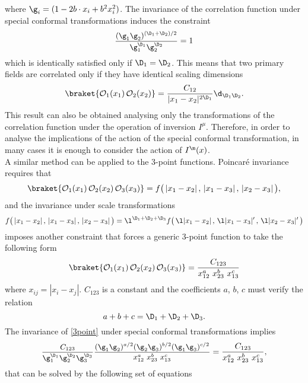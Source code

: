 \documentclass[a4paper,11pt,openright,twoside]{book}
\newcommand{\mO}{\mathcal{O}}
\newcommand{\sdfrac}[2]{\mbox{\small$\displaystyle\frac{#1}{#2}$}}
\numberwithin{equation}{section}
\begin{document}
where $\g_i=(1-2b\cdot x_i+b^2 x_i^2)$. The invariance of the correlation function under special conformal transformations induces the constraint
\begin{equation}
	\sdfrac{(\g_1\g_2)^{(\D_1+\D_2)/2}}{\g_1^{\D_1}\g_2^{\D_2}}=1
\end{equation}
which is identically satisfied only if $\D_1=\D_2$. This means that two primary fields are correlated only if they have identical scaling dimensions
\begin{equation}
	\braket{\mO_1(x_1)\,\mO_2(x_2)}=\frac{C_{12}}{|x_1-x_2|^{2\D_1}}\d_{\D_1\D_2}.\label{2poin}
\end{equation}
This result can also be obtained analysing only the transformations of the correlation function under the operation of inversion $I^\mu$. Therefore, in order to analyse the implications of the action of the special conformal transformation, in many cases it is enough to consider the action of $I^\m(x)$. \\
A similar method can be applied to the 3-point functions. Poincar\'e invariance requires that
\begin{equation}
	\braket{\mO_1(x_1)\,\mO_2(x_2)\,\mO_3(x_3)}=f\big(\,|x_1-x_2|\, ,\, |x_1-x_3|\,,\,|x_2-x_3|\,\big),
\end{equation}
and the invariance under scale transformations 
\begin{equation}
	f\big(\,|x_1-x_2|\, ,\, |x_1-x_3|\,,\,|x_2-x_3|\,\big)=\l^{\D_1+\D_2+\D_3}f\big(\,\l|x_1-x_2|\, ,\, \l|x_1-x_3|'\,,\,\l|x_2-x_3|'\,\big)
\end{equation}
imposes another constraint that forces a generic 3-point function to take the following form
\begin{equation}
	\braket{\mO_1(x_1)\,\mO_2(x_2)\,\mO_3(x_3)}=\frac{C_{123}}{x_{12}^a\ x_{23}^b\ x_{13}^c}\label{3point}
\end{equation}
where $x_{ij}=|x_i-x_j|$. $C_{123}$ is a constant and the coefficients $a$, $b$, $c$ must verify the relation
\begin{equation}
	a+b+c=\D_1+\D_2+\D_3.
\end{equation}
The invariance of \eqref{3point} under special conformal transformations implies
\begin{equation}
	\sdfrac{C_{123}}{\g_1^{\D_1}\g_2^{\D_2}\g_3^{\D_3}}\sdfrac{(\g_1\g_2)^{a/2}(\g_2\g_3)^{b/2}(\g_1\g_3)^{c/2}}{x_{12}^a\ x_{23}^b\ x_{13}^c}=\frac{C_{123}}{x_{12}^a\ x_{23}^b\ x_{13}^c},
\end{equation}
that can be solved by the following set of equations
\end{document}
